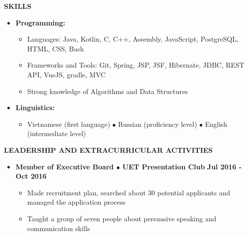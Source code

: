 \documentclass{article}
\newcommand{\cat}[1]{
	\par \noindent\ignorespaces%
	\colorbox[rgb]{0.9, 0.9, 0.9}
	{\begin{minipage}
			[c][1.2\height][c]{\linewidth}{\large\bf #1}
	\end{minipage}}%
}
\begin{document}
	\cat{SKILLS}
	\begin{itemize}
		\item{
		    \textbf{Programming:}
		    \begin{itemize}
		        \item Languages: Java, Kotlin, C, C++, Assembly,  JavaScript, PostgreSQL, HTML, CSS, Bash
		        \item Frameworks and Tools: Git, Spring, JSP, JSF, Hibernate, JDBC,  REST API, VueJS, gradle, MVC 
		        \item  Strong knowledge of Algorithms and Data Structures
		    \end{itemize}
		}
		\item{
		    \textbf{Linguistics: }
		    \begin{itemize}
		        \item Vietnamese (first language) $\bullet$ Russian (proficiency level) $\bullet$ English (intermediate level)
		    \end{itemize}
		}
	\end{itemize}
	
	\cat{LEADERSHIP AND EXTRACURRICULAR ACTIVITIES}
	
	\begin{itemize}
	    \item{
	    \textbf{Member of Executive Board $\bullet$ UET Presentation Club}
	    \hfill
		\textbf{Jul 2016 - Oct 2016}
		\begin{itemize}
		    \item  Made recruitment plan, searched about 30 potential applicants and managed the application process
		    \item Taught a group of seven people about persuasive speaking and communication skills
		\end{itemize}
	    }
	    
		
	\end{itemize}
\end{document}
